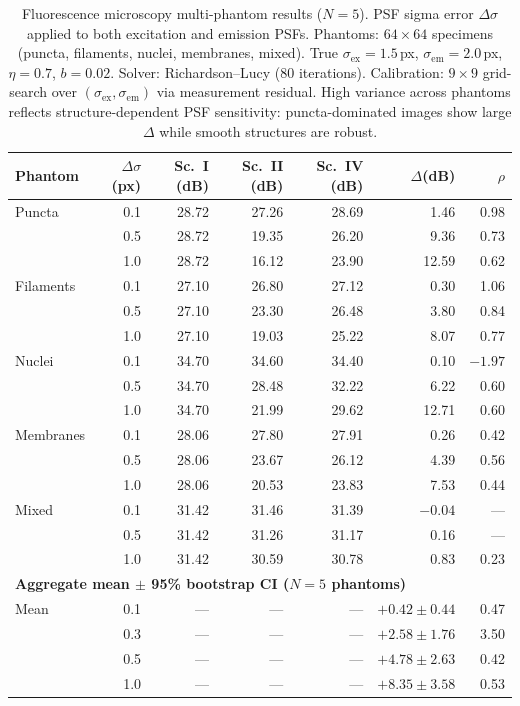 \documentclass[11pt]{article}
\begin{document}
\begin{table}[htbp]
\centering
\caption{Fluorescence microscopy multi-phantom results ($N{=}5$). PSF sigma error $\Delta\sigma$ applied to both excitation and emission PSFs.
Phantoms: $64 \times 64$ specimens (puncta, filaments, nuclei, membranes, mixed).
True $\sigma_{\mathrm{ex}}{=}1.5$\,px, $\sigma_{\mathrm{em}}{=}2.0$\,px, $\eta{=}0.7$, $b{=}0.02$.
Solver: Richardson--Lucy (80 iterations). Calibration: $9 \times 9$ grid-search over $(\sigma_{\mathrm{ex}}, \sigma_{\mathrm{em}})$ via measurement residual.
High variance across phantoms reflects structure-dependent PSF sensitivity: puncta-dominated images show large $\Delta$ while smooth structures are robust.}
\label{tab:fluor_scenes}
\small
\begin{tabular}{l r r r r r r}
\toprule
Phantom & $\Delta\sigma$ (px) & Sc.~I (dB) & Sc.~II (dB) & Sc.~IV (dB) & $\Delta$(dB) & $\rho$ \\
\midrule
Puncta       & 0.1 & 28.72 & 27.26 & 28.69 &  1.46 & 0.98 \\
             & 0.5 & 28.72 & 19.35 & 26.20 &  9.36 & 0.73 \\
             & 1.0 & 28.72 & 16.12 & 23.90 & 12.59 & 0.62 \\
Filaments    & 0.1 & 27.10 & 26.80 & 27.12 &  0.30 & 1.06 \\
             & 0.5 & 27.10 & 23.30 & 26.48 &  3.80 & 0.84 \\
             & 1.0 & 27.10 & 19.03 & 25.22 &  8.07 & 0.77 \\
Nuclei       & 0.1 & 34.70 & 34.60 & 34.40 &  0.10 & $-1.97$ \\
             & 0.5 & 34.70 & 28.48 & 32.22 &  6.22 & 0.60 \\
             & 1.0 & 34.70 & 21.99 & 29.62 & 12.71 & 0.60 \\
Membranes    & 0.1 & 28.06 & 27.80 & 27.91 &  0.26 & 0.42 \\
             & 0.5 & 28.06 & 23.67 & 26.12 &  4.39 & 0.56 \\
             & 1.0 & 28.06 & 20.53 & 23.83 &  7.53 & 0.44 \\
Mixed        & 0.1 & 31.42 & 31.46 & 31.39 & $-0.04$ & --- \\
             & 0.5 & 31.42 & 31.26 & 31.17 &  0.16 & --- \\
             & 1.0 & 31.42 & 30.59 & 30.78 &  0.83 & 0.23 \\
\midrule
\multicolumn{7}{l}{\textbf{Aggregate mean $\pm$ 95\% bootstrap CI ($N{=}5$ phantoms)}} \\
\midrule
Mean   & 0.1 & --- & --- & --- & $+0.42 \pm 0.44$ & 0.47 \\
       & 0.3 & --- & --- & --- & $+2.58 \pm 1.76$ & 3.50 \\
       & 0.5 & --- & --- & --- & $+4.78 \pm 2.63$ & 0.42 \\
       & 1.0 & --- & --- & --- & $+8.35 \pm 3.58$ & 0.53 \\
\bottomrule
\end{tabular}
\end{table}
\end{document}
